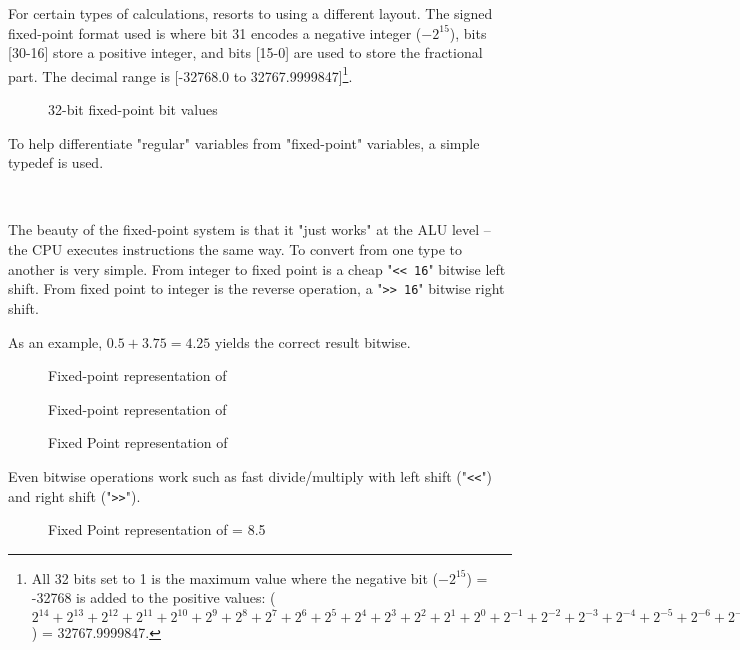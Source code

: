 For certain types of calculations, \doom{} resorts to using a different layout. The signed fixed-point format used is  where bit 31 encodes a negative integer ($-2^{15}$), bits [30-16] store a positive integer, and bits [15-0] are used to store the fractional part. The decimal range is [-32768.0 to 32767.9999847]\footnote{All 32 bits set to 1 is the maximum value where the negative bit ($-2^{15}$) = -32768 is added to the positive values:  
 ($2^{14} + 2^{13} + 2^{12} + 2^{11} + 2^{10} + 2^9 + 2^8 + 2^7 + 2^6 + 2^5 + 2^4 + 2^3 + 2^2 + 2^1 + 2^0 + 2^{-1} + 2^{-2}+ 2^{-3}+ 2^{-4}+ 2^{-5}+ 2^{-6}+ 2^{-7}+ 2^{-8}+ 2^{-9}+ 2^{-10}+ 2^{-11}+ 2^{-12}+ 2^{-13}+ 2^{-14}+ 2^{-15}+ 2^{-16}$) = 32767.9999847.}.\\
\par
\begin{figure}[H]
 \centering
  
  \caption{32-bit \doom{} fixed-point bit values}
\end{figure}
\par 
To help differentiate "regular" variables from "fixed-point" variables, a simple typedef  is used.\\
\par
{}\\
\par
The beauty of the fixed-point system is that it "just works" at the ALU level -- the CPU executes instructions the same way. To convert from one type to another is very simple. From integer to fixed point is a cheap "\verb!<< 16!" bitwise left shift. From fixed point to integer is the reverse operation, a "\verb|>> 16|" bitwise right shift.\\
\par


As an example, $0.5 + 3.75 = 4.25$ yields the correct result bitwise.\\
\par
\begin{figure}[H]
  \centering
  
  \caption{Fixed-point representation of }
\end{figure}
\begin{figure}[H]
  \centering
  
  \caption{Fixed-point representation of }
\end{figure}
\begin{figure}[H]
  \centering
  
  \caption{Fixed Point representation of }
\end{figure}
\par
Even bitwise operations work such as fast divide/multiply with left shift ("\verb!<<!") and right shift ("\verb|>>|").\\
\par
\begin{figure}[H]
  \centering
  
  \caption{Fixed Point representation of  = 8.5}
\end{figure}
\par

